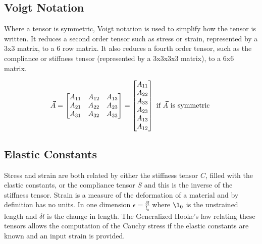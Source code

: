 \FloatBarrier
\subsection{Voigt Notation}

Where a tensor is symmetric, Voigt notation is used to simplify how the tensor is written.  It reduces a second order tensor such as stress or strain, represented by a 3x3 matrix, to a 6 row matrix.  It also reduces a fourth order tensor, such as the compliance or stiffness tensor (represented by a 3x3x3x3 matrix), to a 6x6 matrix. 


\begin{equation}
\begin{split}
\vec{A} =
\begin{bmatrix}
A_{11} & A_{12} & A_{13}   \\
A_{21} & A_{22} & A_{23}   \\
A_{31} & A_{32} & A_{33}   \\
\end{bmatrix}
= 
\begin{bmatrix}
A_{11} \\
A_{22} \\
A_{33} \\
A_{23} \\
A_{13} \\
A_{12} \\
\end{bmatrix}
\textnormal{  if } \vec{A}  \textnormal{ is symmetric }
\end{split}
\label{eq:voigtexample}
\end{equation}



\subsection{Elastic Constants}

Stress and strain are both related by either the stiffness tensor $C$, filled with the elastic constants, or the compliance tensor $S$ and this is the inverse of the stiffness tensor.  Strain is a measure of the deformation of a material and by definition has no units.  In one dimension $\epsilon = \frac{\delta l}{l_0}$ where $\l_0$ is the unstrained length and $\delta l$ is the change in length.  The Generalized Hooke's law relating these tensors allows the computation of the Cauchy stress if the elastic constants are known and an input strain is provided.

